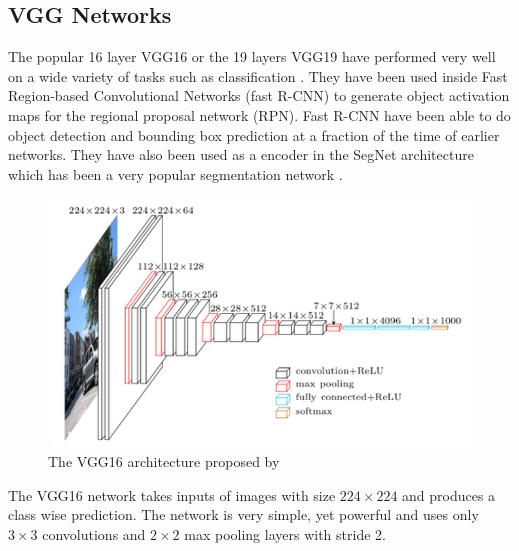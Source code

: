 \documentclass{kththesis}
\begin{document}
\subsection{VGG Networks}
The popular 16 layer VGG16 or the 19 layers VGG19 have performed very well on a wide variety of tasks such as classification \parencite{simonyan_very_2014}. They have been used inside Fast Region-based Convolutional Networks (fast R-CNN) \parencite{ren_faster_2015, girshick_fast_2015} to generate object activation maps for the regional proposal network (RPN). Fast R-CNN have been able to do object detection and bounding box prediction at a fraction of the time of earlier networks. They have also been used as a encoder in the SegNet architecture which has been a very popular segmentation network \parencite{badrinarayanan_segnet:_2015}.
\begin{figure}[H]
  \centering
      \includegraphics[scale=0.5]{vgg}
  \caption{The VGG16 architecture proposed by \cite{simonyan_very_2014}} \label{fig:vgg}
\end{figure}
\noindent The VGG16 network takes inputs of images with size $224 \times 224$ and produces a class wise prediction. The network is very simple, yet powerful and uses only $3 \times 3$ convolutions and $2 \times 2$ max pooling layers with stride 2.
\end{document}

